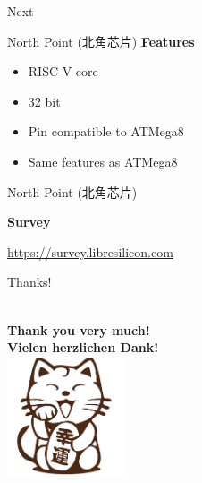 \documentclass[aspectratio=169]{beamer}
\begin{document}
\begin{frame}{Next}
\end{frame}

\begin{frame}{North Point \cjkfont(北角芯片)}
	\textbf{Features}

	\begin{itemize}
		\item RISC-V core
		\item 32 bit
		\item Pin compatible to ATMega8
		\item Same features as ATMega8
	\end{itemize}
\end{frame}

\begin{frame}{North Point \cjkfont(北角芯片)}
	\begin{center}
		\begingroup
		\huge
		\textbf{Survey}

		\url{https://survey.libresilicon.com}
		\endgroup
	\end{center}
\end{frame}

\begin{frame}{Thanks!}
	\begin{center}
		\textbf{} \\
		\textbf{Thank you very much!} \\
		\textbf{Vielen herzlichen Dank!} \\
		\includegraphics[width=100pt]{images/cat.png}
	\end{center}
\end{frame}
\end{document}
